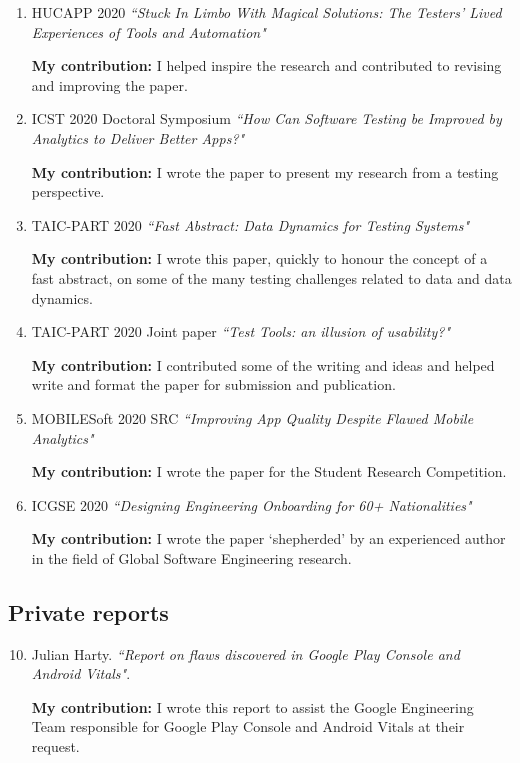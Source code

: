 \begin{enumerate}
    \item HUCAPP 2020 \emph{``Stuck In Limbo With Magical Solutions: The Testers’ Lived Experiences of Tools and Automation"}
    
    \textbf{My contribution:} I helped inspire the research and contributed to revising and improving the paper.
    
    \item ICST 2020 Doctoral Symposium \emph{``How Can Software Testing be Improved by Analytics to Deliver Better Apps?"}
    
    \textbf{My contribution:} I wrote the paper to present my research from a testing perspective.
    
    \item TAIC-PART 2020 \emph{``Fast Abstract: Data Dynamics for Testing Systems"}
    
    \textbf{My contribution:} I wrote this paper, quickly to honour the concept of a fast abstract, on some of the many testing challenges related to data and data dynamics.
    
    \item TAIC-PART 2020 Joint paper \emph{``Test Tools: an illusion of usability?"}
    
    \textbf{My contribution:} I contributed some of the writing and ideas and helped write and format the paper for submission and publication. 
    
    \item MOBILESoft 2020 SRC \emph{``Improving App Quality Despite Flawed Mobile Analytics"}
    
    \textbf{My contribution:} I wrote the paper for the Student Research Competition.
    
    \item ICGSE 2020 \emph{``Designing Engineering Onboarding for 60+ Nationalities"}
    
    \textbf{My contribution:} I wrote the paper `shepherded' by an experienced author in the field of Global Software Engineering research.
    
\end{enumerate}

\subsection{Private reports}
\begin{enumerate}

    \setcounter{enumi}{9}
    \item Julian Harty. \emph{``Report on flaws discovered in Google Play Console and Android Vitals"}.
    
    \textbf{My contribution:} I wrote this report to assist the Google Engineering Team responsible for Google Play Console and Android Vitals at their request.

\end{enumerate}

